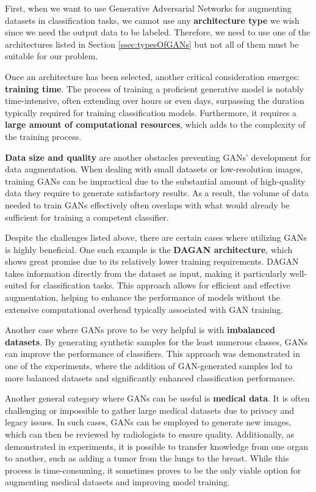 First, when we want to use Generative Adversarial Networks for augmenting datasets in classification tasks, we cannot use any \textbf{architecture type} we wish since we need the output data to be labeled. Therefore, we need to use one of the architectures listed in Section \ref{ssec:typesOfGANs} but not all of them must be suitable for our problem. 

Once an architecture has been selected, another critical consideration emerges: \textbf{training time}. The process of training a proficient generative model is notably time-intensive, often extending over hours or even days, surpassing the duration typically required for training classification models. Furthermore, it requires a \textbf{large amount of computational resources}, which adds to the complexity of the training process.

\textbf{Data size and quality} are another obstacles preventing GANs' development for data augmentation. When dealing with small datasets or low-resolution images, training GANs can be impractical due to the substantial amount of high-quality data they require to generate satisfactory results. As a result, the volume of data needed to train GANs effectively often overlaps with what would already be sufficient for training a competent classifier.

Despite the challenges listed above, there are certain cases where utilizing GANs is highly beneficial. One such example is the \textbf{DAGAN architecture}, which shows great promise due to its relatively lower training requirements. DAGAN takes information directly from the dataset as input, making it particularly well-suited for classification tasks. This approach allows for efficient and effective augmentation, helping to enhance the performance of models without the extensive computational overhead typically associated with GAN training.

Another case where GANs prove to be very helpful is with \textbf{imbalanced datasets}. By generating synthetic samples for the least numerous classes, GANs can improve the performance of classifiers. This approach was demonstrated in one of the experiments, where the addition of GAN-generated samples led to more balanced datasets and significantly enhanced classification performance.

Another general category where GANs can be useful is \textbf{medical data}. It is often challenging or impossible to gather large medical datasets due to privacy and legacy issues. In such cases, GANs can be employed to generate new images, which can then be reviewed by radiologists to ensure quality. Additionally, as demonstrated in experiments, it is possible to transfer knowledge from one organ to another, such as adding a tumor from the lungs to the breast. While this process is time-consuming, it sometimes proves to be the only viable option for augmenting medical datasets and improving model training.

